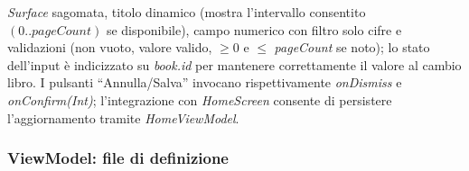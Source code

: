 \documentclass{article}
\begin{document}
\begin{itemize}
\begin{itemize}
\begin{itemize}
      \textit{Surface} sagomata, titolo dinamico (mostra l’intervallo consentito \((0..pageCount)\) se disponibile), 
      campo numerico con filtro solo cifre e validazioni (non vuoto, valore valido, \(\ge 0\) e \(\le\) \textit{pageCount} se noto); 
      lo stato dell’input è indicizzato su \textit{book.id} per mantenere correttamente il valore al cambio libro. I pulsanti “Annulla/Salva” 
      invocano rispettivamente \textit{onDismiss} e \textit{onConfirm(Int)}; l’integrazione con \textit{HomeScreen} consente di persistere l’aggiornamento tramite \textit{HomeViewModel}.
    \end{itemize}
  \end{itemize}
  
\end{itemize}

\subsubsection{ViewModel: file di definizione}
\end{document}
